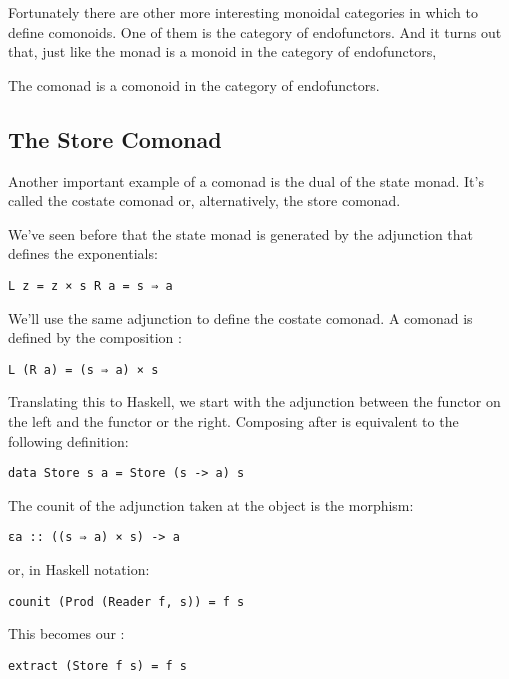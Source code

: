 Fortunately there are other more interesting monoidal categories in
which to define comonoids. One of them is the category of endofunctors.
And it turns out that, just like the monad is a monoid in the category
of endofunctors,

The comonad is a comonoid in the category of endofunctors.

\subsection{The Store Comonad}\label{the-store-comonad}

Another important example of a comonad is the dual of the state monad.
It's called the costate comonad or, alternatively, the store comonad.

We've seen before that the state monad is generated by the adjunction
that defines the exponentials:

\begin{verbatim}
L z = z × s R a = s ⇒ a
\end{verbatim}

We'll use the same adjunction to define the costate comonad. A comonad
is defined by the composition :

\begin{verbatim}
L (R a) = (s ⇒ a) × s
\end{verbatim}

Translating this to Haskell, we start with the adjunction between the
 functor on the left and the  functor or the
right. Composing  after  is equivalent to
the following definition:

\begin{verbatim}
data Store s a = Store (s -> a) s
\end{verbatim}

The counit of the adjunction taken at the object  is the
morphism:

\begin{verbatim}
εa :: ((s ⇒ a) × s) -> a
\end{verbatim}

or, in Haskell notation:

\begin{verbatim}
counit (Prod (Reader f, s)) = f s
\end{verbatim}

This becomes our :

\begin{verbatim}
extract (Store f s) = f s
\end{verbatim}

